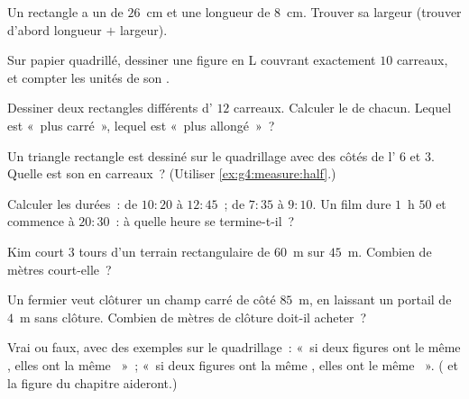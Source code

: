 \begin{exercise}[$\star$]\label{exo:g4:measure:4}
Un rectangle a un  de $26$~cm et une longueur de $8$~cm.
Trouver sa largeur (trouver d'abord longueur $+$ largeur).
\end{exercise}

\begin{exercise}[$\star$]\label{exo:g4:measure:5}
Sur papier quadrillé, dessiner une figure en L couvrant exactement
$10$ carreaux, et compter les unités de son .
\end{exercise}

\begin{exercise}[$\star$]\label{exo:g4:measure:6}
Dessiner deux rectangles différents d' $12$ carreaux. Calculer
le  de chacun. Lequel est «~plus carré~», lequel est
«~plus allongé~»~?
\end{exercise}

\begin{exercise}[$\star$]\label{exo:g4:measure:7}
Un triangle rectangle est dessiné sur le quadrillage avec des côtés
de l' $6$ et $3$. Quelle est son  en carreaux~?
(Utiliser \cref{ex:g4:measure:half}.)
\end{exercise}

\begin{exercise}[$\star$]\label{exo:g4:measure:8}
Calculer les durées~: de $10{:}20$ à $12{:}45$~; de $7{:}35$ à
$9{:}10$. Un film dure $1$~h $50$ et commence à $20{:}30$~: à
quelle heure se termine-t-il~?
\end{exercise}

\begin{exercise}[$\star$]\label{exo:g4:measure:9}
Kim court $3$ tours d'un terrain rectangulaire de $60$~m sur
$45$~m. Combien de mètres court-elle~?
\end{exercise}

\begin{exercise}[$\star\star$]\label{exo:g4:measure:10}
Un fermier veut clôturer un champ carré de côté $85$~m, en laissant
un portail de $4$~m sans clôture. Combien de mètres de clôture
doit-il acheter~?
\end{exercise}

\begin{exercise}[$\star\star$]\label{exo:g4:measure:11}
Vrai ou faux, avec des exemples sur le quadrillage~: «~si deux
figures ont le même , elles ont la même ~»~; «~si
deux figures ont la même , elles ont le même ~».
( et la figure du chapitre aideront.)
\end{exercise}
